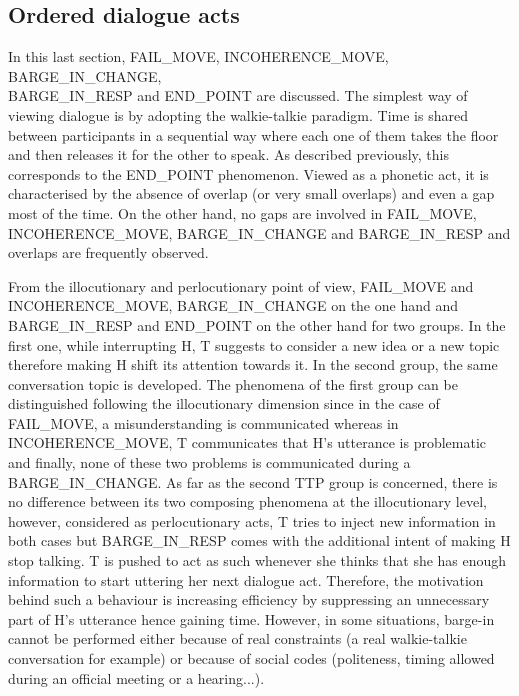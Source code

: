     \subsection{Ordered dialogue acts}

         In this last section, FAIL\_MOVE, INCOHERENCE\_MOVE, BARGE\_IN\_CHANGE,\\ BARGE\_IN\_RESP and END\_POINT are discussed. The simplest way of viewing dialogue is by adopting the walkie-talkie paradigm. Time is shared between participants in a sequential way where each one of them takes the floor and then releases it for the other to speak. As described previously, this corresponds to the END\_POINT phenomenon. Viewed as a phonetic act, it is characterised by the absence of overlap (or very small overlaps) and even a gap most of the time. On the other hand, no gaps are involved in FAIL\_MOVE, INCOHERENCE\_MOVE, BARGE\_IN\_CHANGE and BARGE\_IN\_RESP and overlaps are frequently observed.

         From the illocutionary and perlocutionary point of view, FAIL\_MOVE and INCOHERENCE\_MOVE, BARGE\_IN\_CHANGE on the one hand and BARGE\_IN\_RESP and END\_POINT on the other hand for two groups. In the first one, while interrupting H, T suggests to consider a new idea or a new topic therefore making H shift its attention towards it. In the second group, the same conversation topic is developed. The phenomena of the first group can be distinguished following the illocutionary dimension since in the case of FAIL\_MOVE, a misunderstanding is communicated whereas in INCOHERENCE\_MOVE, T communicates that H's utterance is problematic and finally, none of these two problems is communicated during a BARGE\_IN\_CHANGE. As far as the second TTP group is concerned, there is no difference between its two composing phenomena at the illocutionary level, however, considered as perlocutionary acts, T tries to inject new information in both cases but BARGE\_IN\_RESP comes with the additional intent of making H stop talking. T is pushed to act as such whenever she thinks that she has enough information to start uttering her next dialogue act. Therefore, the motivation behind such a behaviour is increasing efficiency by suppressing an unnecessary part of H's utterance hence gaining time. However, in some situations, barge-in cannot be performed either because of real constraints (a real walkie-talkie conversation for example) or because of social codes (politeness, timing allowed during an official meeting or a hearing...).
				

